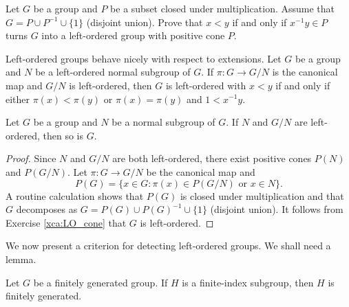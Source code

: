 \begin{exercise}
\label{xca:LO_cone}
	Let $G$ be a group and $P$ be a subset closed under multiplication. Assume that 
	$G=P\cup P^{-1}\cup \{1\}$ (disjoint union). Prove that $x<y$ if and only if
	$x^{-1}y\in P$ turns $G$ into a left-ordered group with positive cone $P$.
\end{exercise}

Left-ordered groups behave nicely with respect to extensions. Let $G$ be a group
and $N$ be a left-ordered normal subgroup of $G$. If $\pi\colon G\to G/N$ is the 
canonical map and $G/N$ is left-ordered, then
$G$ is left-ordered with
$x<y$ if and only if either $\pi(x)<\pi(y)$ or $\pi(x)=\pi(y)$ and $1<x^{-1}y$. 


\begin{proposition}
	Let $G$ be a group and $N$ be a normal subgroup of $G$. 
	If $N$ and $G/N$ are left-ordered, then so is $G$.
\end{proposition}

\begin{proof}
	Since $N$ and $G/N$ are both left-ordered, there exist positive cones 
	$P(N)$ and $P(G/N)$. Let $\pi\colon G\to G/N$ be the canonical map and 
	\[
		P(G)=\{x\in G:\pi(x)\in P(G/N)\text{ or }x\in N\}.
	\]	
	A routine calculation shows that $P(G)$ is closed under multiplication 
	and that $G$ decomposes as $G=P(G)\cup P(G)^{-1}\cup \{1\}$ (disjoint union). It follows
	from Exercise \ref{xca:LO_cone} that 
	$G$ is left-ordered. 
\end{proof}


%

We now present a criterion for detecting left-ordered groups. We shall need 
a lemma. 

\begin{lemma}
	\label{lem:fg}
	Let $G$ be a finitely generated group. If $H$ is a finite-index subgroup, 
	then $H$ is finitely generated. 
\end{lemma}

